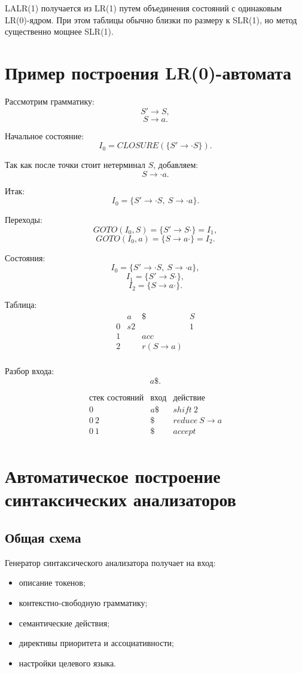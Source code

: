\documentclass[12pt,a4paper]{article}
\begin{document}
LALR(1) получается из LR(1) путем объединения состояний с одинаковым LR(0)-ядром. При этом таблицы обычно близки по размеру к SLR(1), но метод существенно мощнее SLR(1).

\section{Пример построения LR(0)-автомата}

Рассмотрим грамматику:
\[
S' \to S,
\]
\[
S \to a.
\]

Начальное состояние:
\[
I_0=CLOSURE(\{S'\to\cdot S\}).
\]

Так как после точки стоит нетерминал $S$, добавляем:
\[
S\to\cdot a.
\]

Итак:
\[
I_0 = \{S'\to\cdot S,\ S\to\cdot a\}.
\]

Переходы:
\[
GOTO(I_0,S)=\{S'\to S\cdot\}=I_1,
\]
\[
GOTO(I_0,a)=\{S\to a\cdot\}=I_2.
\]

Состояния:
\[
I_0=\{S'\to\cdot S,\ S\to\cdot a\},
\]
\[
I_1=\{S'\to S\cdot\},
\]
\[
I_2=\{S\to a\cdot\}.
\]

Таблица:
\[
\begin{array}{c|cc|c}
 & a & \$ & S\\
\hline
0 & s2 & & 1\\
1 & & acc & \\
2 & & r(S\to a) & \\
\end{array}
\]

Разбор входа:
\[
a\$.
\]

\[
\begin{array}{c|c|c}
\text{стек состояний} & \text{вход} & \text{действие}\\
\hline
0 & a\$ & shift\ 2\\
0\ 2 & \$ & reduce\ S\to a\\
0\ 1 & \$ & accept\\
\end{array}
\]

\section{Автоматическое построение синтаксических анализаторов}

\subsection{Общая схема}

Генератор синтаксического анализатора получает на вход:
\begin{itemize}
    \item описание токенов;
    \item контекстно-свободную грамматику;
    \item семантические действия;
    \item директивы приоритета и ассоциативности;
    \item настройки целевого языка.
\end{itemize}
\end{document}
